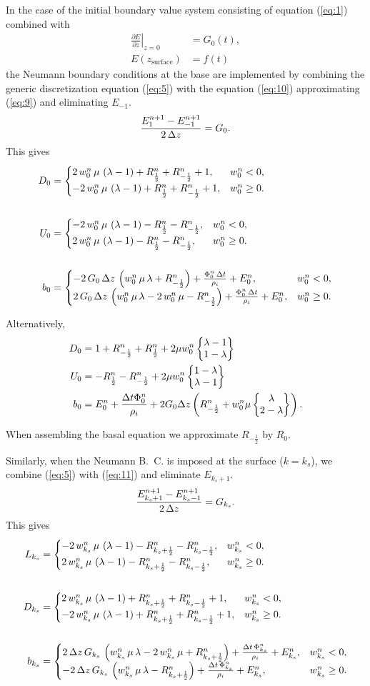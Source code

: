 \documentclass{article}
\newcommand{\wcase}[3]{\begin{cases} #1, & w^{n}_{#3} < 0,\\#2, & w^{n}_{#3} \ge 0.\end{cases}}
\newcommand{\wcaseeq}[4]{#1 &= \wcase{#2}{#3}{#4}}
\begin{document}
In the case of the initial boundary value system consisting of
equation (\ref{eq:1}) combined with
\begin{align}
  \label{eq:9}
  \left.\frac{\partial E}{\partial z}\right|_{z = 0} &= G_{0}(t),\\
  E(z_{\text{surface}}) &= f(t)
\end{align}
the Neumann boundary conditions at the base are implemented by
combining the generic discretization equation (\ref{eq:5}) with the
equation (\ref{eq:10}) approximating (\ref{eq:9}) and eliminating
$E_{-1}$.
\begin{equation}
  \label{eq:10}
  \frac{E^{n+1}_{1}-E^{n+1}_{-1}}{2\,\Delta z}=G_{0}.
\end{equation}
This gives
\begin{align}
  \wcaseeq{D_{0}}{\Dmb}{\Dpb}{0}\\
  \notag\\
  \wcaseeq{U_{0}}{\Umb}{\Upb}{0}\\
  \notag\\
  \wcaseeq{b_{0}}{\Bmb}{\Bpb}{0}
\end{align}

\renewcommand{\Rp}{R^{n}_{\frac{1}{2}}}
\renewcommand{\Rm}{R^{n}_{-\frac{1}{2}}}
\renewcommand{\W}{w^{n}_{0}}

\newcommand{\rhs}[1]{E^{n}_{#1} + \frac{\Delta t \Phi^{n}_{#1}}{\rho_{i}}}

Alternatively,
\begin{align}
  D_{0} &= 1 + \Rm + \Rp + 2\mu\W \wstack{\lambda - 1}{1 - \lambda}\\
  U_{0} &= -\Rp -\Rm + 2\mu\W \wstack{1 - \lambda}{\lambda - 1}\\
  b_{0} &= \rhs{0} + 2G_{0}\Delta z \left( \Rm + \W\mu\wstack{\lambda}{2 - \lambda} \right).
\end{align}

When assembling the basal equation we approximate $R_{-\frac{1}{2}}$ by $R_{0}$.

\newcommand{\ks}{k_{s}}

Similarly, when the Neumann B.~C. is imposed at the surface ($k =
\ks$), we combine (\ref{eq:5}) with (\ref{eq:11}) and eliminate $E_{\ks+1}$.
\begin{equation}
  \label{eq:11}
  \frac{E^{n+1}_{k_{s}+1}-E^{n+1}_{k_{s}-1}}{2\,\Delta z}=G_{k_{s}}.
\end{equation}
This gives
\begin{align}
  \wcaseeq{L_{\ks}}{\Lms}{\Lps}{\ks}\\
  \notag\\
  \wcaseeq{D_{\ks}}{\Dms}{\Dps}{\ks}\\
  \notag\\
  \wcaseeq{b_{\ks}}{\Bms}{\Bps}{\ks}
\end{align}
\end{document}

